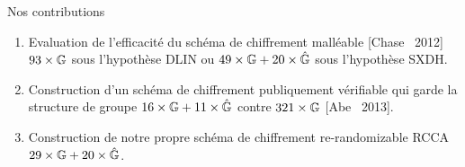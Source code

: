 \begin{frame}{Nos contributions}

  \begin{enumerate}
  \item\alert<+>{ Evaluation de l'efficacit\'e du sch\'ema de chiffrement mall\'eable [Chase \etal~2012] $93\times\mathbb{G}$ sous l'hypoth\`ese DLIN ou $49\times\mathbb{G} +20 \times\hat{\mathbb{G}}$ sous l'hypoth\`ese SXDH.}
  \item\alert<+>{ Construction d'un sch\'ema de chiffrement publiquement v\'erifiable qui garde la structure de groupe $16\times\mathbb{G} + 11\times\hat{\mathbb{G}}$ contre $321\times\mathbb{G}$ [Abe \etal~2013].}
  \item\alert<+>{ Construction de notre propre sch\'ema de chiffrement re-randomizable RCCA $29 \times\mathbb{G} + 20 \times\hat{\mathbb{G}}$.}
  \end{enumerate}
\end{frame}
